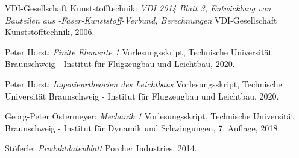 \begin{thebibliography}{99}
	VDI-Gesellschaft Kunststofftechnik:
	\textit{VDI 2014 Blatt 3, Entwicklung von Bauteilen aus -Faser-Kunststoff-Verbund, Berechnungen}
	VDI-Gesellschaft Kunststofftechnik, 2006.
	
	Peter Horst:
	\textit{Finite Elemente 1}
	Vorlesungsskript, Technische Universität Braunschweig - Institut für Flugzeugbau und Leichtbau, 2020.
	
	Peter Horst:
	\textit{Ingenieurtheorien des Leichtbaus}
	Vorlesungsskript, Technische Universität Braunschweig - Institut für Flugzeugbau und Leichtbau, 2020.
	
	Georg-Peter Ostermeyer:
	\textit{Mechanik 1}
	Vorlesungsskript, Technische Universität Braunschweig - Institut für Dynamik und Schwingungen, 7. Auflage, 2018.
	
	Stöferle:
	\textit{Produktdatenblatt}
	Porcher Industries, 2014.
	
	
\end{thebibliography}
\endgroup